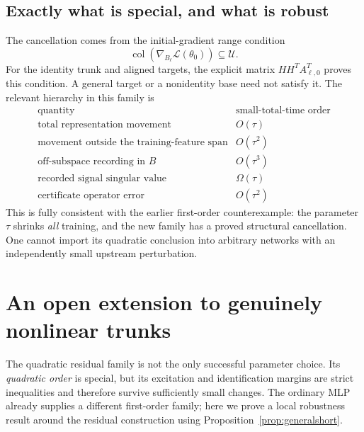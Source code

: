 \documentclass[12pt,a4paper]{article}
\theoremstyle{readable}
\theoremstyle{definition}\newtheorem{example}[theorem]{Example}
\newcommand{\col}{\operatorname{col}}\newcommand{\row}{\operatorname{row}}
\begin{document}
\subsection{Exactly what is special, and what is robust}
The cancellation comes from the initial-gradient range condition
\[
\col(\nabla_{B_\ell}\mathcal L(\theta_0))\subseteq\mathcal U.
\]
For the identity trunk and aligned targets, the explicit matrix \(HH^TA_{\ell,0}^T\) proves this condition. A general target or a nonidentity base need not satisfy it. The relevant hierarchy in this family is
\[
\begin{array}{c|c}
\text{quantity}&\text{small-total-time order}\\\hline
\text{total representation movement}&O(\tau)\\
\text{movement outside the training-feature span}&O(\tau^2)\\
\text{off-subspace recording in }B&O(\tau^3)\\
\text{recorded signal singular value}&\Omega(\tau)\\
\text{certificate operator error}&O(\tau^2)
\end{array}
\]
This is fully consistent with the earlier first-order counterexample: the parameter \(\tau\) shrinks \emph{all} training, and the new family has a proved structural cancellation. One cannot import its quadratic conclusion into arbitrary networks with an independently small upstream perturbation.

\section{An open extension to genuinely nonlinear trunks}
\label{sec:openfamily}

The quadratic residual family is not the only successful parameter choice. Its \emph{quadratic order} is special, but its excitation and identification margins are strict inequalities and therefore survive sufficiently small changes. The ordinary MLP already supplies a different first-order family; here we prove a local robustness result around the residual construction using Proposition~\ref{prop:generalshort}.
\end{document}
